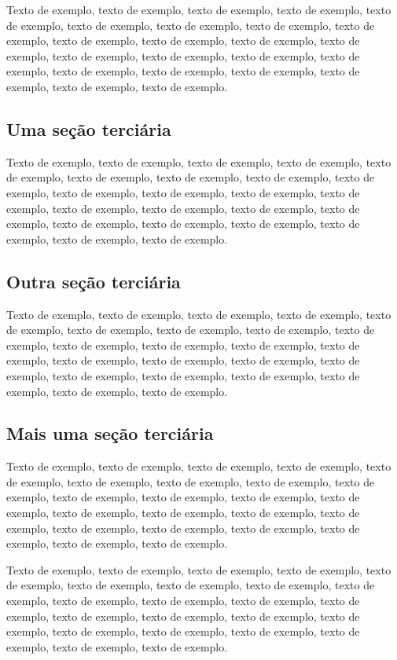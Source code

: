 \documentclass[
	12pt,				%
	oneside,			%
	a4paper,			%
	english,			%
	brazil				%
	]{abntex2ppgsi}
\begin{document}
Texto de exemplo, texto de exemplo, texto de exemplo, texto de exemplo, texto de exemplo, texto de exemplo, texto de exemplo, texto de exemplo, texto de exemplo, texto de exemplo, texto de exemplo, texto de exemplo, texto de exemplo, texto de exemplo, texto de exemplo, texto de exemplo, texto de exemplo, texto de exemplo, texto de exemplo, texto de exemplo, texto de exemplo, texto de exemplo, texto de exemplo.

\subsection{Uma seção terciária}

Texto de exemplo, texto de exemplo, texto de exemplo, texto de exemplo, texto de exemplo, texto de exemplo, texto de exemplo, texto de exemplo, texto de exemplo, texto de exemplo, texto de exemplo, texto de exemplo, texto de exemplo, texto de exemplo, texto de exemplo, texto de exemplo, texto de exemplo, texto de exemplo, texto de exemplo, texto de exemplo, texto de exemplo, texto de exemplo, texto de exemplo.

\subsection{Outra seção terciária}

Texto de exemplo, texto de exemplo, texto de exemplo, texto de exemplo, texto de exemplo, texto de exemplo, texto de exemplo, texto de exemplo, texto de exemplo, texto de exemplo, texto de exemplo, texto de exemplo, texto de exemplo, texto de exemplo, texto de exemplo, texto de exemplo, texto de exemplo, texto de exemplo, texto de exemplo, texto de exemplo, texto de exemplo, texto de exemplo, texto de exemplo.

\subsection{Mais uma seção terciária}

Texto de exemplo, texto de exemplo, texto de exemplo, texto de exemplo, texto de exemplo, texto de exemplo, texto de exemplo, texto de exemplo, texto de exemplo, texto de exemplo, texto de exemplo, texto de exemplo, texto de exemplo, texto de exemplo, texto de exemplo, texto de exemplo, texto de exemplo, texto de exemplo, texto de exemplo, texto de exemplo, texto de exemplo, texto de exemplo, texto de exemplo.

Texto de exemplo, texto de exemplo, texto de exemplo, texto de exemplo, texto de exemplo, texto de exemplo, texto de exemplo, texto de exemplo, texto de exemplo, texto de exemplo, texto de exemplo, texto de exemplo, texto de exemplo, texto de exemplo, texto de exemplo, texto de exemplo, texto de exemplo, texto de exemplo, texto de exemplo, texto de exemplo, texto de exemplo, texto de exemplo, texto de exemplo.
\end{document}
